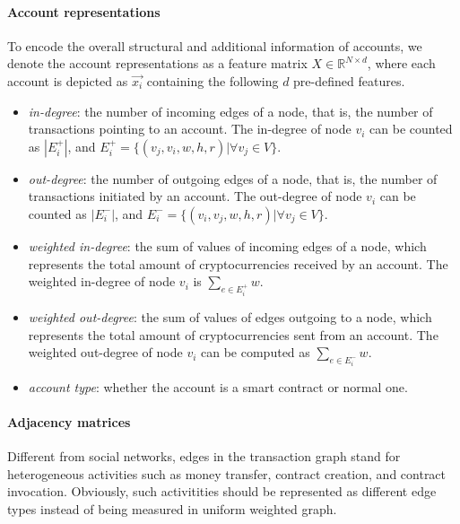 

\paragraph{Account representations} To encode the overall structural and additional information of accounts, we denote the account representations as a feature matrix $X \in \mathbb{R}^{N \times d}$, where each account is depicted as $\vec{x_i}$ containing the following $d$ pre-defined features.

\begin{itemize}
	\item \emph{in-degree}: the number of incoming edges of a node, that is, the number of transactions pointing to an account. The in-degree of node $v_i$ can be counted as $|E_{i}^{+}|$, and $E_{i}^{+}=\{(v_j,v_i,w,h,r)| \forall v_j \in V\}$.
	\item \emph{out-degree}: the number of outgoing edges of a node, that is, the number of transactions initiated by an account. The out-degree of node $v_i$ can be counted as $|E_{i}^{-}|$, and $E_{i}^{-}=\{(v_i,v_j,w,h,r)| \forall v_j \in V\}$.
	\item \emph{weighted in-degree}: the sum of values of incoming edges of a node, which represents the total amount of cryptocurrencies received by an account. The weighted in-degree of node $v_i$ is $\sum_{e\in E_{i}^{+}}w$.
	\item \emph{weighted out-degree}: the sum of values of edges outgoing to a node, which represents the total amount of cryptocurrencies sent from an account. The weighted out-degree of node $v_i$ can be computed as $\sum_{e\in E_{i}^{-}}w$.
	\item \emph{account type}: whether the account is a smart contract or normal one.
\end{itemize}

\paragraph{Adjacency matrices} Different from social networks, edges in the transaction graph stand for heterogeneous activities such as money transfer, contract creation, and contract invocation. Obviously, such %
activitities should be represented as different edge types instead of being measured in uniform weighted graph.

